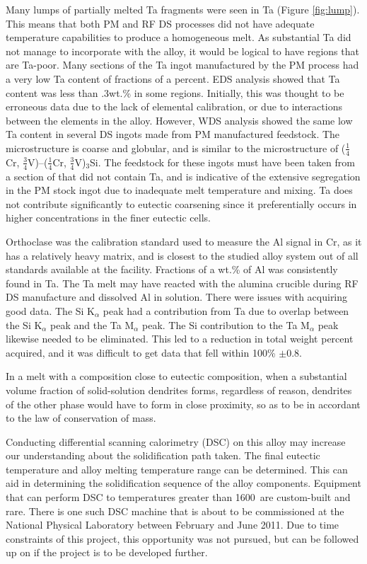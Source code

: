 Many lumps of partially melted Ta fragments were seen in Ta (Figure \ref{fig:lump}).  This means that both PM and RF DS processes did not have adequate temperature capabilities to produce a homogeneous melt.  As substantial Ta did not manage to incorporate with the alloy, it would be logical to have regions that are Ta-poor.  Many sections of the Ta ingot manufactured by the PM process had a very low Ta content of fractions of a percent.  EDS analysis showed that Ta content was less than .3wt.\% in some regions.  Initially, this was thought to be erroneous data due to the lack of elemental calibration, or due to interactions between the elements in the alloy.  However, WDS analysis showed the same low Ta content in several DS ingots made from PM manufactured feedstock.  The microstructure is coarse and globular, and is similar to the microstructure of ($\frac{1}{4}$Cr, $\frac{3}{4}$V)--($\frac{1}{4}$Cr, $\frac{3}{4}$V)$_3$Si.  The feedstock for these ingots must have been taken from a section of that did not contain Ta, and is indicative of the extensive segregation in the PM stock ingot due to inadequate melt temperature and mixing.  Ta does not contribute significantly to eutectic coarsening since it preferentially occurs in higher concentrations in the finer eutectic cells.

Orthoclase was the calibration standard used to measure the Al signal in Cr, as it has a relatively heavy matrix, and is closest to the studied alloy system out of all standards available at the facility.  Fractions of a wt.\% of Al was consistently found in Ta.  The Ta melt may have reacted with the alumina crucible during RF DS manufacture and dissolved Al in solution.  There were issues with acquiring good data.  The Si K$_{\alpha}$ peak had a contribution from Ta due to overlap between the Si K$_{\alpha}$ peak and the Ta M$_{\alpha}$ peak.  The Si contribution to the Ta M$_{\alpha}$ peak likewise needed to be eliminated.  This led to a reduction in total weight percent acquired, and it was difficult to get data that fell within 100\% $\pm$0.8. 

In a melt with a composition close to eutectic composition, when a substantial volume fraction of solid-solution dendrites forms, regardless of reason, dendrites of the other phase would have to form in close proximity, so as to be in accordant to the law of conservation of mass. 

Conducting differential scanning calorimetry (DSC) on this alloy may increase our understanding about the solidification path taken.  The final eutectic temperature and alloy melting temperature range can be determined.  This can aid in determining the solidification sequence of the alloy components.  Equipment that can perform DSC to temperatures greater than 1600\celsius\ are custom-built and rare.  There is one such DSC machine that is about to be commissioned at the National Physical Laboratory between February and June 2011.  Due to time constraints of this project, this opportunity was not pursued, but can be followed up on if the project is to be developed further.
 

